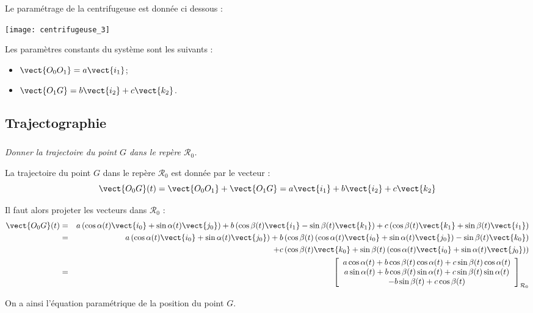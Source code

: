 Le paramétrage de la centrifugeuse est donnée ci dessous : 



\begin{center}
\texttt{[image: centrifugeuse\_3]}
\end{center}

Les paramètres constants du système sont les suivants : 
\begin{itemize}%
\item $\vect{O_0O_1} = a \vect{i_1}$;
\item $\vect{O_1G} = b \vect{i_2} + c \vect{k_2}$.
\end{itemize}


\subsection*{Trajectographie}

\subparagraph{}
\textit{Donner la trajectoire du point $G$ dans le repère $\mathcal{R}_0$.}
\ifprof
\begin{corrige}
La trajectoire du point $G$ dans le repère $\mathcal{R}_0$  est donnée par le vecteur :
$$
\vect{O_0 G}(t)  = \vect{O_0O_1} + \vect{O_1G}
= a \vect{i_1} +  b \vect{i_2} + c \vect{k_2}
$$

Il faut alors projeter les vecteurs dans $\mathcal{R}_0$ : 
\begin{eqnarray*}
\vect{O_0 G}(t) &=& a \left(\cos\alpha(t) \vect{i_0} + \sin\alpha(t) \vect{j_0} \right) 
+ b \left(\cos\beta(t) \vect{i_1} - \sin\beta(t) \vect{k_1} \right) 
+ c\left(\cos\beta(t) \vect{k_1} + \sin\beta(t)\vect{i_1}\right)\\
&=& a \left(\cos\alpha(t) \vect{i_0} + \sin\alpha(t) \vect{j_0} \right) 
+ b \left(\cos\beta(t) \left(\cos\alpha(t) \vect{i_0} + \sin\alpha(t) \vect{j_0} \right) - \sin\beta(t) \vect{k_0} \right) \\
&& + c\left(\cos\beta(t) \vect{k_0} + \sin\beta(t)  \left(\cos\alpha(t) \vect{i_0} + \sin\alpha(t) \vect{j_0} \right) \right)\\
&=& \left[ \begin{array}{c} 
a \cos\alpha(t) + b \cos\beta(t) \cos\alpha(t) +c \sin\beta(t)\cos\alpha(t)\\
a \sin\alpha(t) + b \cos\beta(t) \sin\alpha(t) +c \sin\beta(t)\sin\alpha(t) \\
- b\sin\beta(t) + c\cos\beta(t)
\end{array}\right]_{\mathcal{R}_0}
\end{eqnarray*}

On a ainsi l'équation paramétrique de la position du point $G$.

\end{corrige}
\else \fi


